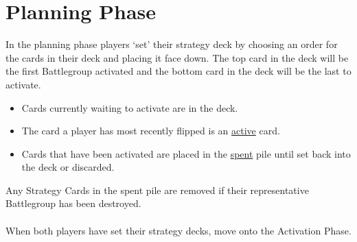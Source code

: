 \chapter{Planning Phase}

In the planning phase players `set' their strategy deck by choosing an order for the cards in their deck and placing it face down. The top card in the deck will be the first Battlegroup activated and the bottom card in the deck will be the last to activate.

\begin{itemize}
	\item Cards currently waiting to activate are in the deck.
	\item The card a player has most recently flipped is an \underline{active} card.
	\item Cards that have been activated are placed in the \underline{spent} pile until set back into the deck or discarded.
\end{itemize}
Any Strategy Cards in the spent pile are removed if their representative Battlegroup has been destroyed.
\\\\
When both players have set their strategy decks, move onto the Activation Phase.
